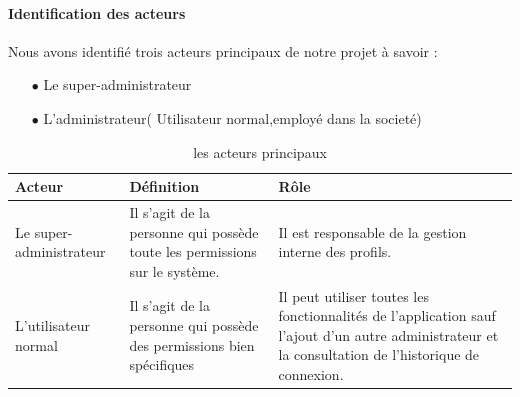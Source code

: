 \documentclass{article}
\begin{document}
\paragraph{Identification des acteurs}
Nous avons identifié trois acteurs principaux de notre projet à savoir :
\begin{enumerate}
\item[$\bullet$] Le super-administrateur
\item[$\bullet$] L'administrateur( Utilisateur normal,employé dans la societé)
\end{enumerate}
\begin{table}[H]
\centering
\label{tab:tab1} 
 \begin{tabularx}{\textwidth}{|X|X|X|}
\hline
\bfseries{ Acteur} &\bfseries{ Définition} &\bfseries{ Rôle} \\ \hline
Le super-administrateur& Il s’agit de la personne qui possède toute les permissions sur le système. &Il est responsable de la gestion interne des profils.\\
\hline
L'utilisateur normal & Il s'agit de la personne qui possède des permissions bien spécifiques & Il peut utiliser toutes les fonctionnalités de l'application sauf l'ajout d'un autre administrateur et la consultation de l'historique de connexion.\\
\hline
\end{tabularx}
\caption[tableau1 : les acteurs principaux]{les acteurs principaux}
\end{table}
\end{document}
